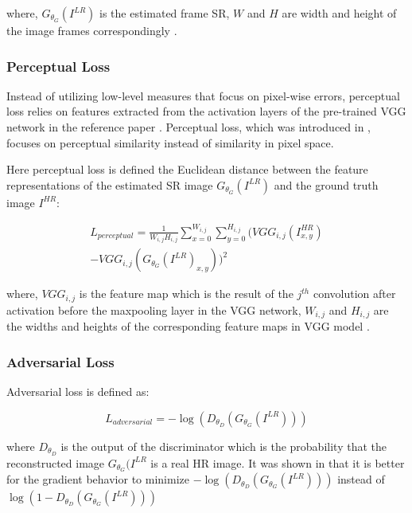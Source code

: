 \documentclass[conference]{IEEEtran}
\begin{document}
where, $G_{\theta_G} (I^{LR})$ is the estimated frame SR, $W$ and $H$ are width and height of the image frames correspondingly \cite{iSeeBetter_2020}.

\subsubsection{Perceptual Loss \label{sec:perceptual_loss}}

Instead of utilizing low-level measures that focus on pixel-wise errors, perceptual loss relies on features extracted from the activation layers of the pre-trained VGG network in the reference paper \cite{vgg_very_deep_cnn_2014}. Perceptual loss, which was introduced in \cite{sr_with_deep_conv_sufficient_stats_2015, texture_synth_cnn_2015}, focuses on perceptual similarity instead of similarity in pixel space.

Here perceptual loss is defined the Euclidean distance between the feature representations of the estimated SR image $G_{\theta_G} (I^{LR})$ and the ground truth image $I^{HR}$:

\begin{gather*} %
	L_{perceptual} = \frac{1}{W_{i,j} H_{i,j}} \sum_{x=0}^{W_{i,j}} \sum_{y=0}^{H_{i,j}} ( VGG_{i,j} (I^{HR}_{x,y}) \\- VGG_{i,j} (G_{\theta_G} (I^{LR})_{x,y}) )^2
\end{gather*}

where, $VGG_{i,j}$ is the feature map which is the result of the $j^{th}$ convolution after activation before the maxpooling layer in the VGG network, $W_{i,j}$ and $H_{i,j}$  are the widths and heights of the corresponding feature maps in VGG model \cite{iSeeBetter_2020}.

\subsubsection{Adversarial Loss\label{sec:adversarial_loss}}

Adversarial loss is defined as:

\begin{equation} \label{eq:adversarial_loss}
	L_{adversarial} = -\log ( D_{\theta_D}( G_{\theta_G} (I^{LR}) ) )
\end{equation}

where $D_{\theta_D}$ is the output of the discriminator which is the probability that the reconstructed image $G_{\theta_G} (I^{LR}$ is a real HR image. It was shown in \cite{goodfellow2014generative} that it is better for the gradient behavior to minimize $-\log ( D_{\theta_D}( G_{\theta_G} (I^{LR}) ) )$ instead of $\log (1 - D_{\theta_D}( G_{\theta_G} (I^{LR}) ) )$
\end{document}
